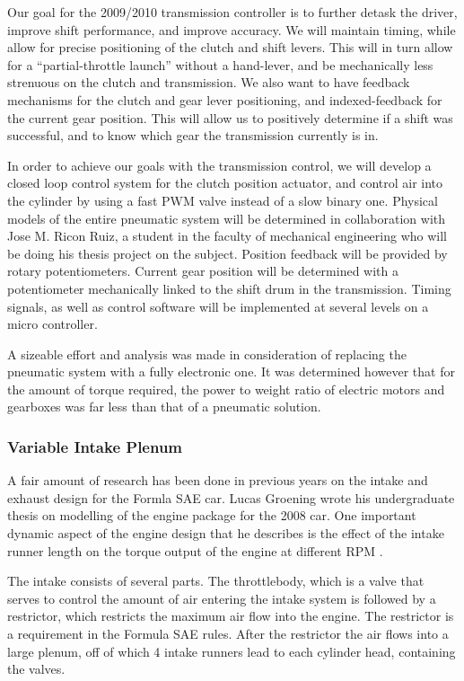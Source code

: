 Our goal for the 2009/2010 transmission controller is to further detask the driver, improve shift performance, and improve accuracy. We will maintain timing, while allow for precise positioning of the clutch and shift levers. This will in turn allow for a {}``partial-throttle launch'' without a hand-lever, and be mechanically less strenuous on the clutch and transmission. We also want to have feedback mechanisms for the clutch and gear lever positioning, and indexed-feedback for the current gear position. This will allow us to positively determine if a shift was successful, and to know which gear the transmission currently is in.

In order to achieve our goals with the transmission control, we will develop a closed loop control system for the clutch position actuator, and control air into the cylinder by using a fast PWM valve instead of a slow binary one. Physical models of the entire pneumatic system will be determined in collaboration with Jose M. Ricon Ruiz, a student in the faculty of mechanical engineering who will be doing his thesis project on the subject. Position feedback will be provided by rotary potentiometers. Current gear position will be determined with a potentiometer mechanically linked to the shift drum in the transmission. Timing signals, as well as control software will be implemented at several levels on a micro controller.

A sizeable effort and analysis was made in consideration of replacing the pneumatic system with a fully electronic one. It was determined however that for the amount of torque required, the power to weight ratio of electric motors and gearboxes was far less than that of a pneumatic solution.

\subsubsection{Variable Intake Plenum}

A fair amount of research has been done in previous years on the intake and exhaust design for the Formla SAE car. Lucas Groening wrote his undergraduate thesis on modelling of the engine package for the 2008 car. One important dynamic aspect of the engine design that he describes is the effect of the intake runner length on the torque output of the engine at different RPM \cite{Modelingof20}.

The intake consists of several parts. The throttlebody, which is a valve that serves to control the amount of air entering the intake system is followed by a restrictor, which restricts the maximum air flow into the engine. The restrictor is a requirement in the Formula SAE rules. After the restrictor the air flows into a large plenum, off of which 4 intake runners lead to each cylinder head, containing the valves.

